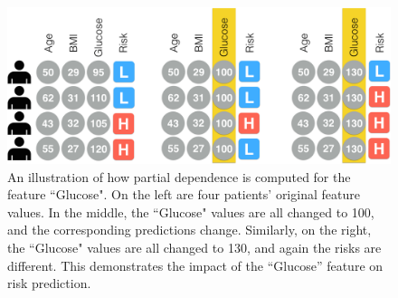 
\begin{figure}
\centering
\includegraphics[width=0.90\linewidth]{prospector/partial-dependence-explanation} %
\caption[An illustration of how partial dependence is computed.]{
An illustration of how partial dependence is computed for the feature ``Glucose".  On the left are four patients' original feature values.  In the middle, the ``Glucose" values are all changed to 100, and the corresponding predictions change.  Similarly, on the right, the ``Glucose" values are all changed to 130, and again the risks are different.  This demonstrates the impact of the ``Glucose'' feature on risk prediction.
}
\label{figs:pdexplain}
\end{figure}